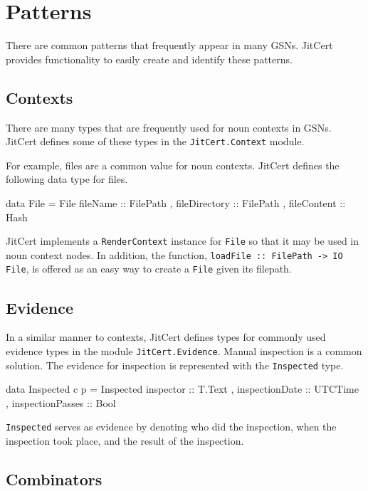 \documentclass{article}
\newcommand{\jitcert}{JitCert\xspace}
\begin{document}

\section{Patterns}

There are common patterns that frequently appear in many GSNs. 
\jitcert provides functionality to easily create and identify these patterns. 

\subsection{Contexts}

There are many types that are frequently used for noun contexts in GSNs. 
\jitcert defines some of these types in the \texttt{JitCert.Context} module. 

For example, files are a common value for noun contexts. 
\jitcert defines the following data type for files. 
\begin{code}
data File = File {
      fileName :: FilePath
    , fileDirectory :: FilePath
    , fileContent :: Hash
    }
\end{code}
\jitcert implements a \texttt{RenderContext} instance for \texttt{File} so that it may be used in noun context nodes.
In addition, the function, \texttt{loadFile :: FilePath -> IO File}, is offered as an easy way to create a \texttt{File} given its filepath. 


\subsection{Evidence}

In a similar manner to contexts, \jitcert defines types for commonly used evidence types in the module \texttt{JitCert.Evidence}. 
Manual inspection is a common solution. 
The evidence for inspection is represented with the \texttt{Inspected} type.
\begin{mcode}
data Inspected c p = Inspected {
      inspector :: T.Text
    , inspectionDate :: UTCTime
    , inspectionPasses :: Bool
    }
\end{mcode}
\texttt{Inspected} serves as evidence by denoting who did the inspection, when the inspection took place, and the result of the inspection. 

\subsection{Combinators}
\end{document}
